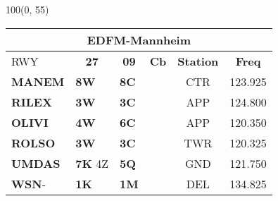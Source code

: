 \documentclass[10pt,landscape,a4paper]{article}
\begin{document}
\begin{textblock}{100}(0, 55)
\begin{table}[]
\begin{tabular}{|llllll}
\multicolumn{6}{c}{\textbf{EDFM-Mannheim}} \\ \hline
\multicolumn{1}{|l|}{RWY} 									& \multicolumn{1}{c|}{\textbf{27}} 			& \multicolumn{1}{c|}{\textbf{09}}  				& \multicolumn{1}{c|}{\textbf{Cb}} 						& \multicolumn{1}{c|}{\textbf{Station}} 	& \multicolumn{1}{c|}{\textbf{Freq}}	\\ \hline
\multicolumn{1}{|l|}{\textbf{MANEM}}							& \multicolumn{1}{l|}{\textbf{8W} }			& \multicolumn{1}{l|}{\textbf{8C}} 				& \multicolumn{1}{c|}{\multirow{6}{*}{\rotatebox{90}{5000ft}}}		& \multicolumn{1}{c|}{CTR}			& \multicolumn{1}{c|}{123.925}	\\ \cline{1-3}
\multicolumn{1}{|l|}{\textbf{RILEX}}							& \multicolumn{1}{l|}{\textbf{3W}}			& \multicolumn{1}{l|}{\textbf{3C} }				& \multicolumn{1}{c|}{}  								& \multicolumn{1}{c|}{APP}			& \multicolumn{1}{c|}{124.800}	\\ \cline{1-3}

\multicolumn{1}{|l|}{\textbf{OLIVI}} 							& \multicolumn{1}{l|}{\textbf{4W}} 			& \multicolumn{1}{l|}{\textbf{6C}}				& \multicolumn{1}{c|}{} 								& \multicolumn{1}{c|}{APP}			& \multicolumn{1}{c|}{120.350}	\\ \cline{1-3}
\multicolumn{1}{|l|}{\textbf{ROLSO}}							& \multicolumn{1}{l|}{\textbf{3W}}			& \multicolumn{1}{l|}{\textbf{3C}}				& \multicolumn{1}{c|}{} 								& \multicolumn{1}{c|}{TWR} 			& \multicolumn{1}{c|}{120.325}		\\ \cline{1-3} 

\multicolumn{1}{|l|}{\textbf{UMDAS}} 						& \multicolumn{1}{l|}{\textbf{7K} 4Z}			& \multicolumn{1}{l|}{\textbf{5Q}}				& \multicolumn{1}{c|}{}								& \multicolumn{1}{c|}{GND}			& \multicolumn{1}{c|}{121.750} 	\\\cline{1-3}
\multicolumn{1}{|l|}{\textbf{WSN}- } 						& \multicolumn{1}{l|}{\textbf{1K}} 			& \multicolumn{1}{l|}{\textbf{1M}}				& \multicolumn{1}{c|}{}  								& \multicolumn{1}{c|}{DEL}			& \multicolumn{1}{c|}{134.825} \\ \hline
\end{tabular}
\end{table}
\end{textblock}
\end{document}
